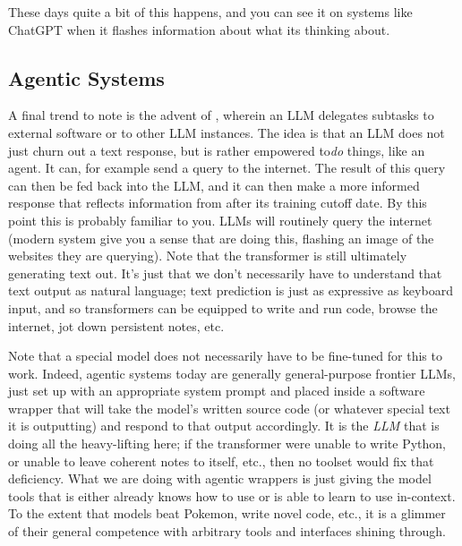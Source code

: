 
These days quite a bit of this happens, and you can see it on systems like
ChatGPT when it flashes information about what its thinking about.
 

\subsection{Agentic Systems}


A final trend to note is the advent of , wherein an
LLM delegates subtasks to external software or to other LLM instances. The idea
is that an LLM does not just churn out a text response, but is rather empowered
to\emph{do} things, like an agent. It can, for example send a query to the
internet. The result of this query can then be fed back into the LLM, and it
can then make a more informed response that reflects information from after its
training cutoff date. By this point this is probably familiar to you. LLMs will
routinely query the internet (modern system give you a sense that are doing
this, flashing an image of the websites they are querying). Note that the
transformer is still ultimately generating text out. It's just that we don't
necessarily have to understand that text output as natural language; text
prediction is just as expressive as keyboard input, and so transformers can be
equipped to write and run code, browse the internet, jot down persistent notes,
etc.

Note that a special model does not necessarily have to be fine-tuned for this
to work. Indeed, agentic systems today are generally general-purpose frontier
LLMs, just set up with an appropriate system prompt and placed inside a
software wrapper that will take the model's written source code (or whatever
special text it is outputting) and respond to that output accordingly. It is
the \emph{LLM} that is doing all the heavy-lifting here; if the transformer
were unable to write Python, or unable to leave coherent notes to itself, etc.,
then no toolset would fix that deficiency. What we are doing with agentic
wrappers is just giving the model tools that is either already knows how to use
or is able to learn to use in-context. To the extent that models beat Pokemon,
write novel code, etc., it is a glimmer of their general competence with
arbitrary tools and interfaces shining through.

